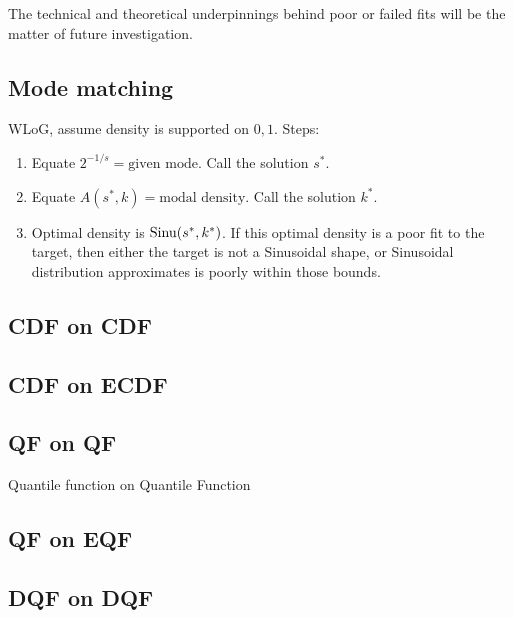 The technical and theoretical underpinnings behind poor or failed fits will be the matter of future investigation.

\subsection{Mode matching}
WLoG, assume density is supported on $0,1$. Steps:
\begin{enumerate}
	\item Equate $2^{-1/s} = \text{given mode}$. Call the solution $s^*$.
	\item Equate $A(s^*, k) = \text{modal density}$. Call the solution $k^*$.
	\item Optimal density is $\operatorname*{Sinu}(s^*, k^*)$. If this optimal density is a poor fit to the target, then either the target is not a Sinusoidal shape, or Sinusoidal distribution approximates is poorly within those bounds.
\end{enumerate}

\subsection{CDF on CDF}

\subsection{CDF on ECDF}

\subsection{QF on QF}
Quantile function on Quantile Function

\subsection{QF on EQF}

\subsection{DQF on DQF}



